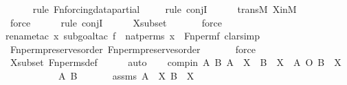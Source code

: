 \begin{isabellebody}
\ \ \ \ \ \isamarkupfalse%
{\isacharparenleft}{\kern0pt}rule\ Fn{\isacharunderscore}{\kern0pt}forcing{\isacharunderscore}{\kern0pt}data{\isacharunderscore}{\kern0pt}partial{\isacharparenright}{\kern0pt}\isanewline
\ \ \ \ \isamarkupfalse%
{\isacharparenleft}{\kern0pt}rule\ conjI{\isacharparenright}{\kern0pt}\isanewline
\ \ \ \ \isamarkupfalse%
\ transM\ XinM\ \isanewline
\ \ \ \ \ \isamarkupfalse%
\ force\ \isanewline
\ \ \ \ \isamarkupfalse%
{\isacharparenleft}{\kern0pt}rule\ conjI{\isacharparenright}{\kern0pt}\isanewline
\ \ \ \ \isamarkupfalse%
\ Xsubset{\isacharprime}{\kern0pt}\isanewline
\ \ \ \ \ \isamarkupfalse%
\ force\isanewline
\ \ \ \ \isamarkupfalse%
{\isacharparenleft}{\kern0pt}rename{\isacharunderscore}{\kern0pt}tac\ x{\isacharcomma}{\kern0pt}\ subgoal{\isacharunderscore}{\kern0pt}tac\ {\isachardoublequoteopen}{\isasymexists}f\ {\isasymin}\ nat{\isacharunderscore}{\kern0pt}perms{\isachardot}{\kern0pt}\ x\ {\isacharequal}{\kern0pt}\ Fn{\isacharunderscore}{\kern0pt}perm{\isacharprime}{\kern0pt}{\isacharparenleft}{\kern0pt}f{\isacharparenright}{\kern0pt}{\isachardoublequoteclose}{\isacharcomma}{\kern0pt}\ clarsimp{\isacharparenright}{\kern0pt}\isanewline
\ \ \ \ \isamarkupfalse%
\ Fn{\isacharunderscore}{\kern0pt}perm{\isacharprime}{\kern0pt}{\isacharunderscore}{\kern0pt}preserves{\isacharunderscore}{\kern0pt}order\ Fn{\isacharunderscore}{\kern0pt}perm{\isacharprime}{\kern0pt}{\isacharunderscore}{\kern0pt}preserves{\isacharunderscore}{\kern0pt}order{\isacharprime}{\kern0pt}\isanewline
\ \ \ \ \ \isamarkupfalse%
\ force\isanewline
\ \ \ \ \isamarkupfalse%
\ Xsubset\ Fn{\isacharunderscore}{\kern0pt}perms{\isacharunderscore}{\kern0pt}def\isanewline
\ \ \ \ \isamarkupfalse%
\ auto\isanewline
\isanewline
\ \ \isamarkupfalse%
\ compin{\isacharcolon}{\kern0pt}\ {\isachardoublequoteopen}{\isasymAnd}A\ B{\isachardot}{\kern0pt}\ A\ {\isasymin}\ X\ {\isasymLongrightarrow}\ B\ {\isasymin}\ X\ {\isasymLongrightarrow}\ A\ O\ B\ {\isasymin}\ X{\isachardoublequoteclose}\isanewline
\ \ \isamarkupfalse%
\ {\isacharminus}{\kern0pt}\ \isanewline
\ \ \ \ \isamarkupfalse%
\ A\ B\ \isanewline
\ \ \ \ \isamarkupfalse%
\ assms{}{\isacharcolon}{\kern0pt}\ {\isachardoublequoteopen}A\ {\isasymin}\ X{\isachardoublequoteclose}\ {\isachardoublequoteopen}B\ {\isasymin}\ X{\isachardoublequoteclose}\ \isanewline

\end{isabellebody}
